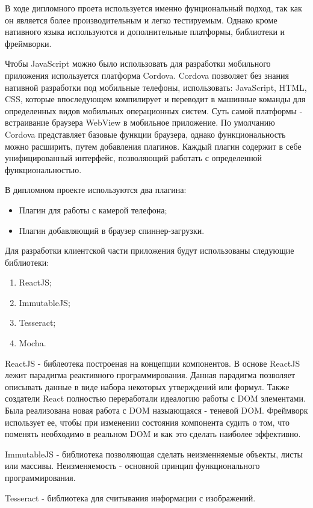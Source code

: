 В ходе дипломного проета используется именно фунциональный подход, так как он является более производительным и легко тестируемым. Однако кроме нативного языка используются и дополнительные платформы, библиотеки и фреймворки.

Чтобы JavaScript можно было использовать для разработки мобильного приложения используется платформа Cordova. Cordova позволяет без знания нативной разработки под мобильные телефоны, использовать: JavaScript, HTML, CSS, которые впоследующем компилирует и переводит в машинные команды для определенных видов мобильных операционных систем. Суть самой платформы - встраивание браузера WebView в мобильное приложение. По умолчанию Cordova представляет базовые функции браузера, однако функциональность можно расширить, путем добавления плагинов. Каждый плагин содержит в себе унифицированный интерфейс, позволяющий работать с определенной функциональностью. 

В дипломном проекте используются два плагина:
\begin{itemize}
  \item Плагин для работы с камерой телефона;
  \item Плагин добавляющий в браузер спиннер-загрузки.
\end{itemize}

Для разработки клиентской части приложения  будут использованы следующие библиотеки:
\begin{enumerate}
\item ReactJS;
\item ImmutableJS;
\item Tesseract;
\item Mocha.
\end{enumerate}

ReactJS - библеотека построеная на концепции компонентов. В основе ReactJS лежит парадигма реактивного программирования. Данная парадигма позволяет описывать данные в виде набора некоторых утверждений или формул. Также создатели React полностью переработали идеалогию работы с DOM элементами. Была реализована новая работа с DOM назыающаяся - теневой DOM. Фреймворк использует ее, чтобы при изменении состояния компонента судить о том, что поменять необходимо в реальном DOM и как это сделать наиболее эффективно.

ImmutableJS - библиотека позволяющая сделать неизменняемые объекты, листы или массивы. Неизменяемость - основной принцип функционального программирования.

Tesseract - библиотека для считывания информации с изображений.


